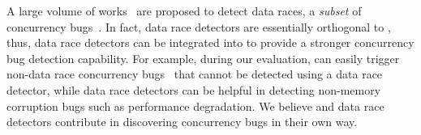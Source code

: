 %
A large volume of works~\cite{pacer, datacollider, hybridchecker,
  literace, helgrind, frost, prorace, tsan, kcsan, txrace} are
proposed to detect data races, a \textit{subset} of concurrency
bugs~\cite{lkmm, linuxmemorymodel}.
%
%
In fact, data race detectors are essentially orthogonal to \sys,
thus, data race detectors can be integrated into \sys to provide a
stronger concurrency bug detection capability.
%
For example, during our evaluation, \sys can easily trigger non-data
race concurrency bugs~\cite{snowboardbug, cve20196974, cve20177533}
that cannot be detected using a data race detector, while data race
detectors can be helpful in detecting non-memory corruption bugs such
as performance degradation.
%
%
We believe \sys and data race detectors contribute in discovering
concurrency bugs in their own way.





